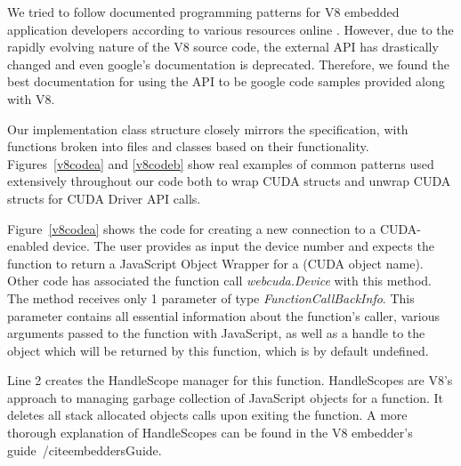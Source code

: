 We tried to follow documented programming patterns for V8 embedded application
developers according to various resources online \cite{embeddersGuide,
nodeJSDocumentation}. However, due to the rapidly evolving nature of the V8
source code, the external API has drastically changed and even google's
documentation \cite{embeddersGuide} is deprecated. Therefore, we found the best
documentation for using the API to be google code samples provided along with
V8.

\lstset{ language=C++, numbers=left, stepnumber=1, tabsize=1, keepspaces=false,
breaklines=true}
\begin{figure*}
	\begin{center}
		\small
		
\end{center}
\caption{Creating new \name Device Object}
\label{v8codea}
	\begin{center}
		\small
		
\end{center}
\caption{C++ Implementation of \namens's \textit{webcuda.free} method}
\label{v8codeb}

\end{figure*}

Our implementation class structure closely mirrors the specification, with
functions broken into files and classes based on their functionality.
Figures~\ref{v8codea} and \ref{v8codeb} show real examples of common patterns used
extensively throughout our code both to wrap CUDA structs and unwrap CUDA
structs for CUDA Driver API calls.  

Figure~\ref{v8codea} shows the code for creating a new connection to a
CUDA-enabled device. The user provides as input the device number and expects
the function to return a JavaScript Object Wrapper for a (CUDA object name).
Other code has associated the function call \textit{webcuda.Device} with this
method. The method receives only 1 parameter of type
\textit{FunctionCallBackInfo}. This parameter contains all essential information
about the function's caller, various arguments passed to the function with
JavaScript, as well as a handle to the object which will be returned by this
function, which is by default undefined. 

Line 2 creates the HandleScope manager for this function.  HandleScopes are V8's
approach to managing garbage collection of JavaScript objects for a function. It
deletes all stack allocated objects calls upon exiting the function.  A more
thorough explanation of HandleScopes can be found in the V8 embedder's
guide~/cite{embeddersGuide}.  

